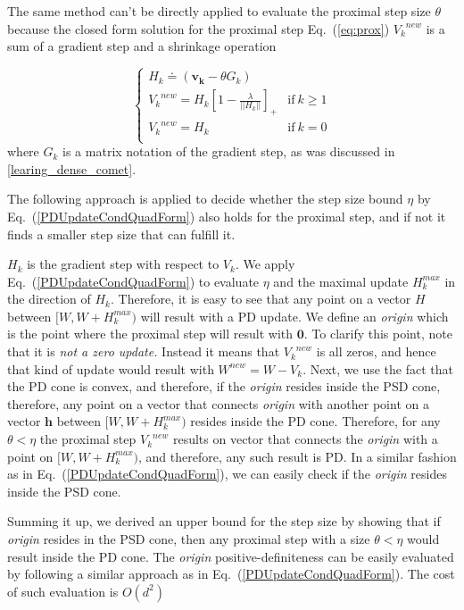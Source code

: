 \documentclass[twoside,11pt]{article}
\newcommand\mat[1]{{#1}}
\renewcommand\vec[1]{\mathbf{#1}}
\newcommand{\W}{\mat{W}}
\newcommand{\newW}{{\mat{W^{new}}}}
\newcommand{\eqdef}{\doteq}
\newcommand{\VVk}{\vec{v_k}}
\newcommand{\Hk}{H_k}
\newcommand{\Vk}{\mat{V_k}}
\renewcommand{\eqref}[1]{Eq.~(\ref{#1})}
\begin{document}
The same method can't be directly applied to evaluate the proximal step size $\theta$ because the closed form solution for the proximal step \eqref{eq:prox} $\Vk^{new}$ is a sum of a gradient step and a shrinkage operation

\begin{equation*}
 \begin{cases}
   \Hk \eqdef (\VVk-\theta G_k) \\ 
   \Vk^{new} = \Hk [1 - \frac{\lambda}{||\Hk||}]_+ & \text{if}\  k \geq 1\\
   \Vk^{new} = \Hk & \text{if}\ k = 0 \\ 
 \end{cases}
\end{equation*}
where $G_k$ is a matrix notation of the gradient step, as was discussed in \ref{learing_dense_comet}. 

The following approach is applied to decide whether the step size bound $\eta$ by \eqref{PDUpdateCondQuadForm} also holds for the proximal step, and if not it finds a smaller step size that can fulfill it.


\newcommand{\Vkorigin}{\emph{origin }}
$\Hk$ is the gradient step with respect to $\Vk$. We apply \eqref{PDUpdateCondQuadForm} to evaluate $\eta$ and the maximal update $\Hk^{max}$ in the direction of $\Hk$. Therefore, it is easy to see that any point on a vector $H$ between $[\W, \W + \Hk^{max})$ will result with a PD update. We define an \Vkorigin which is the point where the proximal step will result with $\vec{0}$. To clarify this point, note that it is \emph{not a zero update.} Instead it means that $\Vk^{new}$ is all zeros, and hence that kind of update would result with $\newW = \W - \Vk$. Next, we use the fact that the PD cone is convex, and therefore, if the \Vkorigin resides inside the PSD cone, therefore, any point on a vector that connects \Vkorigin with another point on a vector $\vec{h}$ between $[\W, \W + \Hk^{max})$ resides inside the PD cone. Therefore, for any $\theta < \eta$ the proximal step $\Vk^{new}$ results on vector that connects the \Vkorigin with a point on $[\W, \W + \Hk^{max})$, and therefore, any such result is PD. In a similar fashion as in \eqref{PDUpdateCondQuadForm}, we can easily check if the \Vkorigin resides inside the PSD cone.  

Summing it up, we derived an upper bound for the step size by showing that if \Vkorigin resides in the PSD cone, then any proximal step with a size $\theta < \eta$ would result inside the PD cone. The \Vkorigin positive-definiteness can be easily evaluated by following a similar approach as in \eqref{PDUpdateCondQuadForm}. The cost of such evaluation is $O(d^2)$
\end{document}
